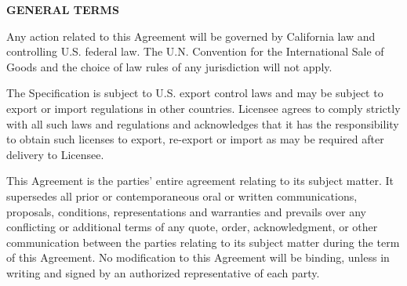 \begin{flushleft}
{\bfseries GENERAL TERMS}

Any action related to this Agreement will be governed by California law and controlling 
U.S. federal law. The U.N. Convention for the International Sale of Goods and the 
choice of law rules of any jurisdiction will not apply.

The Specification is subject to U.S. export control laws and may be subject to export 
or import regulations in other countries. Licensee agrees to comply strictly with 
all such laws and regulations and acknowledges that it has the responsibility to 
obtain such licenses to export, re-export or import as may be required after delivery to Licensee.

This Agreement is the parties' entire agreement relating to its subject matter. 
It supersedes all prior or contemporaneous oral or written communications, proposals, conditions, 
representations and warranties and prevails over any conflicting or additional terms 
of any quote, order,  acknowledgment, or other communication between the parties 
relating to its subject matter during the term of this Agreement. No modification 
to this Agreement will be binding, unless in writing and signed by an authorized 
representative of each party.

\end{flushleft}
